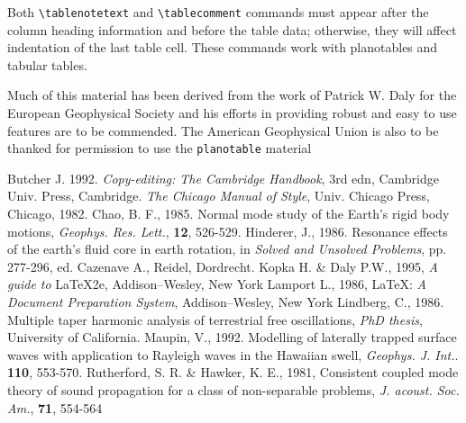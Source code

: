 \documentclass[extra,mreferee]{gji}
\begin{document}
Both \verb"\tablenotetext" and \verb"\tablecomment"
commands must appear after the column heading information
and before the table data; otherwise, they will affect
indentation of the last table cell.  These commands
work with planotables and tabular tables.


\begin{acknowledgments}
Much of this material has been derived from the work of Patrick W. Daly
for the European Geophysical Society and his efforts in providing
robust and easy to use features are to be commended.  The American
Geophysical Union is also to be thanked for permission to use the
\verb"planotable"  material
\end{acknowledgments}

\begin{thebibliography}{}
    Butcher J. 1992. {\it Copy-editing: The Cambridge
    Handbook}, 3rd edn, Cambridge Univ. Press, Cambridge.
    {\it The Chicago Manual of Style}, Univ.
    Chicago Press, Chicago, 1982.
    Chao, B. F., 1985. Normal mode study of the Earth's rigid
     body motions, {\it Geophys. Res. Lett.}, {\bf 12}, 526-529.
    Hinderer, J., 1986. Resonance effects of the earth's fluid
    core in earth rotation, in {\it Solved and Unsolved
    Problems}, pp. 277-296, ed. Cazenave A., Reidel,
    Dordrecht.
    Kopka H. \& Daly P.W., 1995, \textit{A guide to} \LaTeX2e,
    Addison--Wesley, New York
    Lamport L., 1986,  \LaTeX: {\it A Document
    Preparation System}, Addison--Wesley, New York
    Lindberg, C., 1986.  Multiple taper harmonic analysis of
    terrestrial free oscillations, {\it PhD thesis},
    University of California.
    Maupin, V., 1992. Modelling of laterally trapped surface
    waves with application to Rayleigh waves in the Hawaiian
    swell, {\it Geophys. J. Int.}. {\bf 110}, 553-570.
      Rutherford, S. R. \& Hawker, K. E., 1981,
    Consistent coupled mode theory of sound propagation for a
    class of non-separable problems,
   {\it J. acoust. Soc. Am.}, {\bf 71}, 554-564
\end{thebibliography}
\end{document}
